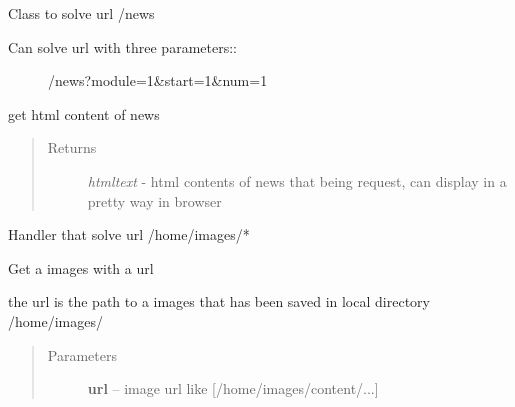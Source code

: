 \documentclass[letterpaper,10pt,english]{sphinxmanual}
\begin{document}

\begin{fulllineitems}
\label{sysunews:sysunews.server.Getnews_html}
Class to solve url /news
\begin{description}
\item[{Can solve url with three parameters::}] \leavevmode
/news?module=1\&start=1\&num=1

\end{description}

\begin{fulllineitems}
\label{sysunews:sysunews.server.Getnews_html.GET}
get html content of news
\begin{quote}\begin{description}
\item[{Returns}] \leavevmode
\emph{htmltext} - html contents of news that being request, can display in a pretty way in browser

\end{description}\end{quote}

\end{fulllineitems}


\end{fulllineitems}


\begin{fulllineitems}
\label{sysunews:sysunews.server.Images}
Handler that solve url /home/images/*

\begin{fulllineitems}
\label{sysunews:sysunews.server.Images.GET}
Get a images with a url

the url is the path to a images that has been saved in local directory /home/images/
\begin{quote}\begin{description}
\item[{Parameters}] \leavevmode
\textbf{url} -- image url like {[}/home/images/content/...{]}

\end{description}\end{quote}

\end{fulllineitems}


\end{fulllineitems}
\end{document}
